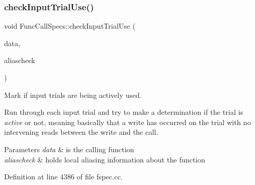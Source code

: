 \subsubsection{\texorpdfstring{checkInputTrialUse()}{checkInputTrialUse()}}
{\footnotesize\ttfamily void Func\+Call\+Specs\+::check\+Input\+Trial\+Use (\begin{DoxyParamCaption}\item[{\mbox{\hyperlink{class_funcdata}{Funcdata}} \&}]{data,  }\item[{\mbox{\hyperlink{class_alias_checker}{Alias\+Checker}} \&}]{aliascheck }\end{DoxyParamCaption})}



Mark if input trials are being actively used. 

Run through each input trial and try to make a determination if the trial is {\itshape active} or not, meaning basically that a write has occurred on the trial with no intervening reads between the write and the call. 
\begin{DoxyParams}{Parameters}
{\em data} & is the calling function \\
\hline
{\em aliascheck} & holds local aliasing information about the function \\
\hline
\end{DoxyParams}


Definition at line 4386 of file fspec.\+cc.

